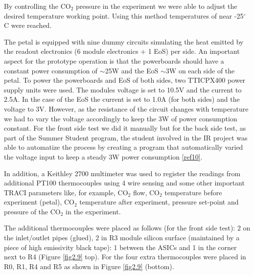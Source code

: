 		By controlling the CO$_{2}$ pressure in the experiment we were able to adjust the desired temperature working point. Using this method temperatures of near -25$^{\circ}$C were reached.
		
		The petal is equipped with nine dummy circuits simulating the heat emitted by the readout electronics (6 module electronics + 1 EoS) per side. An important aspect for the prototype operation is that the powerboards should have a constant power consumption of $\sim$25W and the EoS $\sim$3W on each side of the petal. To power the powerboards and EoS of both sides, two TTICPX400 power supply units were used. The modules voltage is set to 10.5V and the current to 2.5A. In the case of the EoS the current is set to 1.0A (for both sides) and the voltage to 3V. However, as the resistance of the circuit changes with temperature we had to vary the voltage accordingly to keep the 3W of power consumption constant. For the front side test we did it manually but for the back side test, as part of the Summer Student program, the student involved in the IR project was able to automatize the process by creating a program that automatically varied the voltage input to keep a steady 3W power consumption \ref{ref10}.
		
		In addition, a Keithley 2700 multimeter was used to register the readings from additional PT100 thermocouples using 4 wire sensing and some other important TRACI parameters like, for example, CO$_{2}$ flow, CO$_{2}$ temperature before experiment (petal), CO$_{2}$ temperature after experiment, pressure set-point and pressure of the CO$_{2}$ in the experiment.
		
		The additional thermocouples were placed as follows (for the front side test): 2 on the inlet/outlet pipes (glued), 2 in R3 module silicon surface (maintained by a piece of high emissivity black tape): 1 between the ASICs and 1 in the corner next to R4 (Figure \ref{fig2.9} top). For the four extra thermocouples were placed in R0, R1, R4 and R5 as shown in Figure \ref{fig2.9} (bottom).
		
